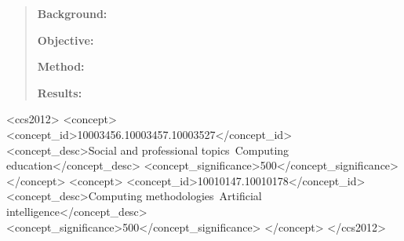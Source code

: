 \documentclass[sigconf]{acmart}
\begin{document}
\title[]{}



\author{Anon Author}
\orcid{}

\author{Anon Author}
\orcid{}

\author{Anon Author}
\orcid{}



\renewcommand{\shortauthors}{}



\begin{abstract}

    \textbf{Background:} 

    \noindent\textbf{Objective:} 

    \noindent\textbf{Method:} 

    \noindent\textbf{Results:} 
\end{abstract}


\begin{CCSXML}
<ccs2012>
  <concept>
   <concept_id>10003456.10003457.10003527</concept_id>
   <concept_desc>Social and professional topics~Computing education</concept_desc>
   <concept_significance>500</concept_significance>
   </concept>
  <concept>
   <concept_id>10010147.10010178</concept_id>
   <concept_desc>Computing methodologies~Artificial intelligence</concept_desc>
   <concept_significance>500</concept_significance>
   </concept>
 </ccs2012>
\end{CCSXML}


\keywords{}
\end{document}
